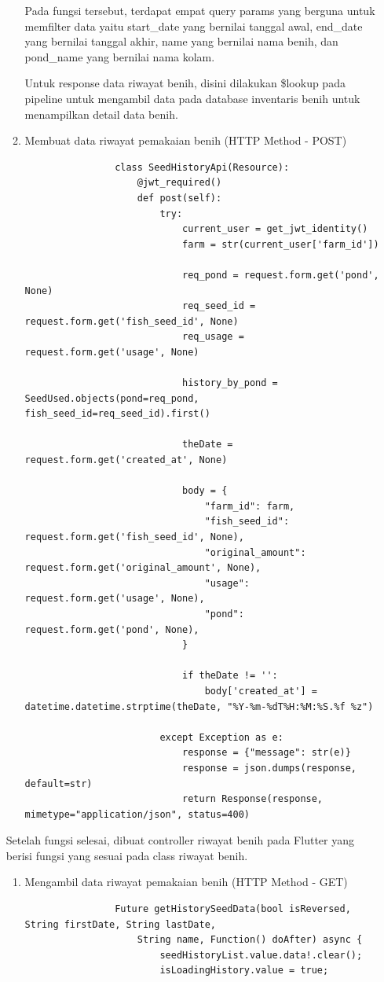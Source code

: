 \begin{spacing}{1.5}
\begin{enumerate}
\begin{enumerate}
			Pada fungsi tersebut, terdapat empat query params yang berguna untuk memfilter data yaitu start\_date yang bernilai tanggal awal, end\_date yang bernilai tanggal akhir, name yang bernilai nama benih, dan pond\_name yang bernilai nama kolam.

			Untuk response data riwayat benih, disini dilakukan \$lookup pada pipeline untuk mengambil data pada database inventaris benih untuk menampilkan detail data benih.

			\item Membuat data riwayat pemakaian benih (HTTP Method - POST)
			
			\begin{lstlisting}
				class SeedHistoryApi(Resource):
					@jwt_required()
					def post(self):
						try:
							current_user = get_jwt_identity()
							farm = str(current_user['farm_id'])
						
							req_pond = request.form.get('pond', None)
							req_seed_id = request.form.get('fish_seed_id', None)
							req_usage = request.form.get('usage', None) 
							
							history_by_pond =  SeedUsed.objects(pond=req_pond, fish_seed_id=req_seed_id).first()
				
							theDate = request.form.get('created_at', None)
				
							body = {
								"farm_id": farm,
								"fish_seed_id": request.form.get('fish_seed_id', None),
								"original_amount": request.form.get('original_amount', None),
								"usage": request.form.get('usage', None),
								"pond": request.form.get('pond', None),
							}
				
							if theDate != '':
								body['created_at'] = datetime.datetime.strptime(theDate, "%Y-%m-%dT%H:%M:%S.%f %z") 
				
						except Exception as e:
							response = {"message": str(e)}
							response = json.dumps(response, default=str)
							return Response(response, mimetype="application/json", status=400)
			\end{lstlisting}
		\end{enumerate}

		Setelah fungsi selesai, dibuat controller riwayat benih pada Flutter yang berisi fungsi yang sesuai pada class riwayat benih.

		\begin{enumerate}
			\item Mengambil data riwayat pemakaian benih (HTTP Method - GET) 
			
			\begin{lstlisting}
				Future getHistorySeedData(bool isReversed, String firstDate, String lastDate,
					String name, Function() doAfter) async {
						seedHistoryList.value.data!.clear();
						isLoadingHistory.value = true;
					

\end{lstlisting}
\end{enumerate}
\end{enumerate}
\end{spacing}
